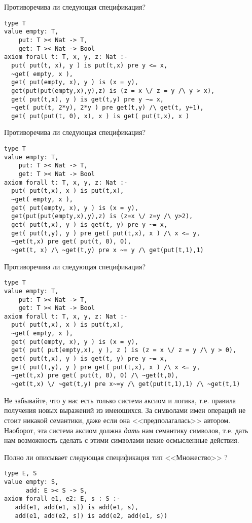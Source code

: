 \z Противоречива ли следующая спецификация?
\begin{lstlisting}
type T
value empty: T,
    put: T >< Nat -> T,
    get: T >< Nat -> Bool
axiom forall t: T, x, y, z: Nat :-
  put( put(t, x), y ) is put(t,x) pre y <= x,
  ~get( empty, x ),
  get( put(empty, x), y ) is (x = y),
  get(put(put(empty,x),y),z) is (z = x \/ z = y /\ y > x),
  get( put(t,x), y ) is get(t,y) pre y ~= x,
  ~get( put(t, 2*y), 2*y ) pre get(t,y) /\ get(t, y+1),
  get( put(put(t, 0), x), x ) is get( put(t,x), x )
\end{lstlisting}

\z Противоречива ли следующая спецификация?
\begin{lstlisting}
type T
value empty: T,
    put: T >< Nat -> T,
    get: T >< Nat -> Bool
axiom forall t: T, x, y, z: Nat :-
  put( put(t,x), x ) is put(t,x),
  ~get( empty, x ),
  get( put(empty, x), y ) is (x = y),
  get(put(put(empty,x),y),z) is (z=x \/ z=y /\ y>2),
  get( put(t,x), y ) is get(t, y) pre y ~= x,
  get( put(t,y), y ) pre get( put(t,x), x ) /\ x <= y,
  ~get(t,x) pre get( put(t, 0), 0),
  ~get(t, x) /\ ~get(t,y) pre x ~= y /\ get(put(t,1),1)
\end{lstlisting}

\z Противоречива ли следующая спецификация?
\begin{lstlisting}
type T
value empty: T,
    put: T >< Nat -> T,
    get: T >< Nat -> Bool
axiom forall t: T, x, y, z: Nat :-
  put( put(t,x), x ) is put(t,x),
  ~get( empty, x ),
  get( put(empty, x), y ) is (x = y),
  get( put( put(empty,x), y ), z ) is (z = x \/ z = y /\ y > 0),
  get( put(t,x), y ) is get(t, y) pre y ~= x,
  get( put(t,y), y ) pre get( put(t,x), x ) /\ x <= y,
  ~get(t,x) pre get( put(t, 0), 0) /\ ~get(t,0),
  ~get(t,x) \/ ~get(t,y) pre x~=y /\ get(put(t,1),1) /\ ~get(t,1)
\end{lstlisting}


Не забывайте, что у нас есть только система аксиом и логика, т.е. правила получения новых выражений из имеющихся. За символами имен операций не стоит никакой семантики, даже если она <<предполагалась>> автором. Наоборот, эта система аксиом должна \emph{дать} нам семантику символов, т.е. дать нам возможность сделать с этими символами некие осмысленные действия.

\z Полно ли описывает следующая спецификация тип <<Множество>> ?
\begin{lstlisting}
type E, S
value empty: S,
      add: E >< S -> S,
axiom forall e1, e2: E, s : S :-
   add(e1, add(e1, s)) is add(e1, s),
   add(e1, add(e2, s)) is add(e2, add(e1, s))
\end{lstlisting}

